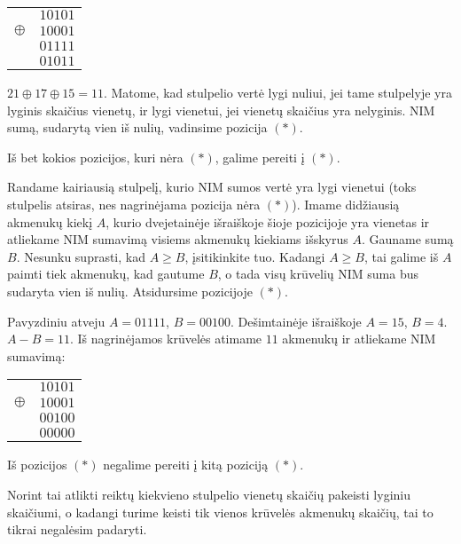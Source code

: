 \begin{center}
  \begin{tabular}[c]{r c}
    & $10101$ \\
    $\oplus$ & $10001$ \\
    & $01111$ \\ \hline
    & $01011$
  \end{tabular}
\end{center}

$21 \oplus 17 \oplus 15=11$. Matome, kad stulpelio vertė lygi nuliui, jei
tame stulpelyje yra lyginis skaičius vienetų, ir lygi vienetui, jei vienetų
skaičius yra nelyginis. NIM sumą, sudarytą vien iš nulių, vadinsime pozicija
$(*)$. 

\begin{teig}
  Iš bet kokios pozicijos, kuri nėra $(*)$, galime pereiti į  $(*)$.
\end{teig}

Randame kairiausią stulpelį, kurio NIM sumos vertė yra lygi vienetui (toks
stulpelis atsiras, nes nagrinėjama pozicija nėra $(*)$). Imame didžiausią
akmenukų kiekį $A$, kurio dvejetainėje išraiškoje šioje pozicijoje yra
vienetas ir atliekame NIM sumavimą visiems akmenukų kiekiams išskyrus $A$.
Gauname sumą $B$.  Nesunku suprasti, kad $A\geq B$, įsitikinkite tuo. Kadangi
$A\geq B$, tai galime iš $A$ paimti tiek akmenukų, kad gautume $B$, o tada visų
krūvelių NIM suma bus sudaryta vien iš nulių. Atsidursime pozicijoje $(*)$.

Pavyzdiniu atveju $A = 01111$, $B = 00100$. Dešimtainėje išraiškoje $A =
15$, $B = 4$. $A - B = 11$. Iš nagrinėjamos krūvelės atimame $11$ akmenukų ir
atliekame NIM sumavimą: 

\begin{center}
  \begin{tabular}[c]{r c}
    & $10101$ \\
    $\oplus$ & $10001$ \\
    & $00100$ \\ \hline
    & $00000$
  \end{tabular}
\end{center}

\begin{teig}
  Iš pozicijos $(*)$ negalime pereiti į kitą poziciją $(*)$.
\end{teig}

Norint tai atlikti reiktų kiekvieno stulpelio vienetų skaičių pakeisti
lyginiu skaičiumi, o kadangi turime keisti tik vienos krūvelės akmenukų
skaičių, tai to tikrai negalėsim padaryti.

